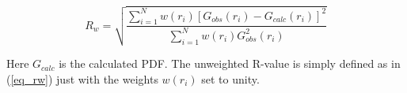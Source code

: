 \begin{equation}
  R_{w} = \sqrt {\frac{\sum\limits_{i=1}^{N} w(r_{i})
                       [G_{obs}(r_{i}) - G_{calc}(r_{i})]^{2}}
                {\sum\limits_{i=1}^{N} w(r_{i}) G_{obs}^{2}(r_{i})}}
  \label{eq_rw}
\end{equation}

\noindent
Here $G_{calc}$ is the calculated PDF. The unweighted R-value is
simply defined as in (\ref{eq_rw}) just with the weights $w(r_{i})$
set to unity.

